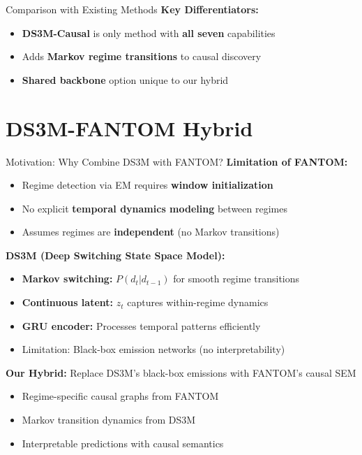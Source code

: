 \documentclass[aspectratio=169]{beamer}
\begin{document}
\begin{frame}{Comparison with Existing Methods}
\vspace{0.2cm}
\textbf{Key Differentiators:}
\begin{itemize}
    \item \textbf{DS3M-Causal} is only method with \textbf{all seven} capabilities
    \item Adds \textbf{Markov regime transitions} to causal discovery
    \item \textbf{Shared backbone} option unique to our hybrid
\end{itemize}
\end{frame}

\section{DS3M-FANTOM Hybrid}

\begin{frame}{Motivation: Why Combine DS3M with FANTOM?}
\textbf{Limitation of FANTOM:}
\begin{itemize}
    \item Regime detection via EM requires \textbf{window initialization}
    \item No explicit \textbf{temporal dynamics modeling} between regimes
    \item Assumes regimes are \textbf{independent} (no Markov transitions)
\end{itemize}

\vspace{0.3cm}
\textbf{DS3M (Deep Switching State Space Model):}
\begin{itemize}
    \item \textbf{Markov switching:} $P(d_t | d_{t-1})$ for smooth regime transitions
    \item \textbf{Continuous latent:} $z_t$ captures within-regime dynamics
    \item \textbf{GRU encoder:} Processes temporal patterns efficiently
    \item \textcolor{warnred}{Limitation:} Black-box emission networks (no interpretability)
\end{itemize}

\vspace{0.3cm}
\textbf{Our Hybrid:} Replace DS3M's black-box emissions with FANTOM's causal SEM
\begin{itemize}
    \item \textcolor{reprogreen}{Regime-specific causal graphs} from FANTOM
    \item \textcolor{reprogreen}{Markov transition dynamics} from DS3M
    \item \textcolor{reprogreen}{Interpretable predictions} with causal semantics
\end{itemize}
\end{frame}
\end{document}
